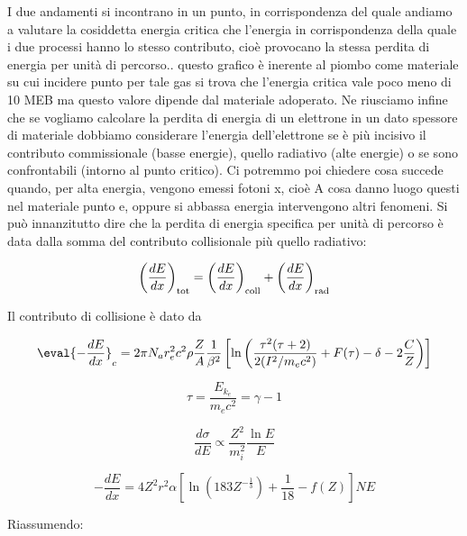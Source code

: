 I due andamenti si incontrano in un punto, in corrispondenza del quale andiamo a valutare la cosiddetta energia critica che l'energia in corrispondenza della quale i due processi hanno lo stesso contributo, cioè provocano la stessa perdita di energia per unità di percorso.. questo grafico è inerente al piombo come materiale su cui incidere punto per tale gas si trova che l'energia critica vale poco meno di 10 MEB ma questo valore dipende dal materiale adoperato. Ne riusciamo infine che se vogliamo calcolare la perdita di energia di un elettrone in un dato spessore di materiale dobbiamo considerare l'energia dell'elettrone se è più incisivo il contributo commissionale (basse energie), quello radiativo (alte energie) o se sono confrontabili (intorno al punto critico). Ci potremmo poi chiedere cosa succede quando, per alta energia, vengono emessi fotoni x, cioè A cosa danno luogo questi nel materiale punto e, oppure si abbassa energia intervengono altri fenomeni. Si può innanzitutto dire che la perdita di energia specifica per unità di percorso è data dalla somma del contributo collisionale più quello radiativo:

$$\left(\frac{dE}{dx}\right)_{\rm tot}
=\left(\frac{dE}{dx}\right)_{\rm coll} + \left(\frac{dE}{dx}\right)_{\rm rad}$$

Il contributo di collisione è dato da

$$\eval{-\frac{dE}{dx}}_{c}
=2 \pi N_a r_e^2 c^2 \rho \frac{Z}{A} \frac{1}{\beta^2} \left[\ln{\left(\frac{\tau^2 (\tau + 2)}{2(I^2/m_e c^2)} + F(\tau) - \delta - 2 \frac{C}{Z}\right)}\right]$$

$$\tau=\frac{E_{k_e}}{m_e c^2}=\gamma - 1$$

$$\frac{d \sigma}{d E} \propto \frac{Z^2}{m_i^2} \frac{\ln{E}}{E}$$

$$-\frac{d E}{d x}
=4 Z^2 r^2 \alpha \left[\ln{(183Z^{-\frac{1}{3}})} + \frac{1}{18} - f(Z)\right]NE$$

Riassumendo:

